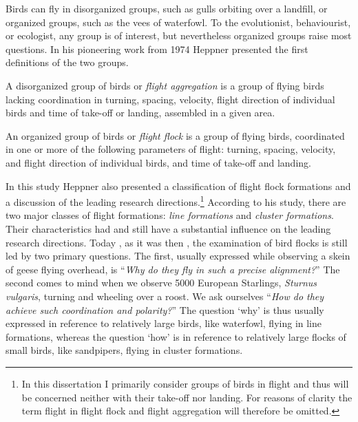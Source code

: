 Birds can fly in disorganized groups, such as gulls orbiting over a landfill, or organized groups, such as the vees of waterfowl. To the evolutionist, behaviourist, or ecologist, any group is of interest, but nevertheless organized groups raise most questions. In his pioneering work from 1974 Heppner \cite{heppner:1974a} presented the first definitions of the two groups. 

\begin{defn}
\label{def:aggregation}
A disorganized group of birds or \emph{flight aggregation} is a group of flying birds lacking coordination in turning, spacing, velocity, flight direction of individual birds and time of take-off or landing, assembled in a given area.
\end{defn}

\begin{defn}
\label{def:flock}
An organized group of birds or \emph{flight flock} is a group of flying birds, coordinated in one or more of the following parameters of flight: turning, spacing, velocity, and flight direction of individual birds, and time of take-off and landing.  
\end{defn}

In this study Heppner also presented a classification of flight flock formations and a discussion of the leading research directions.\footnote{In this dissertation I primarily consider groups of birds in flight and thus will be concerned neither with their take-off nor landing. For reasons of clarity the term flight in flight flock and flight aggregation will therefore be omitted.} According to his study, there are two major classes of flight formations: \emph{line formations} and \emph{cluster formations}. Their characteristics had and still have a substantial influence on the leading research directions. Today \cite{heppner:1997,parrish:1997a}, as it was then \cite{heppner:1974a}, the examination of bird flocks is still led by two primary questions. The first, usually expressed while observing a skein of geese flying overhead, is ``\emph{Why do they fly in such a precise alignment?}'' The second comes to mind when we observe 5000 European Starlings, \emph{Sturnus vulgaris}, turning and wheeling over a roost. We ask ourselves ``\emph{How do they achieve such coordination and polarity?}'' The question `why' is thus usually expressed in reference to relatively large birds, like waterfowl, flying in line formations, whereas the question `how' is in reference to relatively large flocks of small birds, like sandpipers, flying in cluster formations. 

